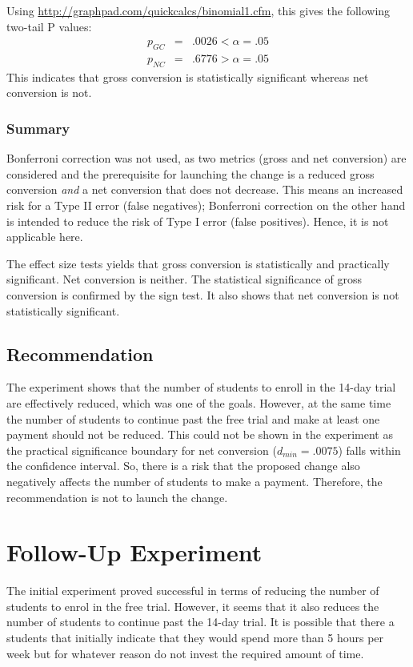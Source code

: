 \documentclass[11pt]{article} %
\begin{document}
Using \url{http://graphpad.com/quickcalcs/binomial1.cfm}, this gives the following two-tail P values:
\begin{eqnarray}
	p_{GC} &=& .0026 < \alpha = .05\\
      p_{NC} &=& .6776 > \alpha = .05
\end{eqnarray}
This indicates that gross conversion is statistically significant whereas net conversion is not.

\subsubsection{Summary}

Bonferroni correction was not used, as two metrics (gross and net conversion) are considered and the prerequisite for launching the change is a reduced gross conversion \textit{and} a net conversion that does not decrease. This means an increased risk for a Type II error (false negatives); Bonferroni correction on the other hand is intended to reduce the risk of Type I error (false positives). Hence, it is not applicable here.

The effect size tests yields that gross conversion is statistically and practically significant. Net conversion is neither. The statistical significance of gross conversion is confirmed by the sign test. It also shows that net conversion is not statistically significant.

\subsection{Recommendation}

The experiment shows that the number of students to enroll in the 14-day trial are effectively reduced, which was one of the goals. However, at the same time the number of students to continue past the free trial and make at least one payment should not be reduced. This could not be shown in the experiment as the practical significance boundary for net conversion ($d_{min} = .0075$) falls within the confidence interval. So, there is a risk that the proposed change also negatively affects the number of students to make a payment. Therefore, the recommendation is not to launch the change.

\section{Follow-Up Experiment}

The initial experiment proved successful in terms of reducing the number of students to enrol in the free trial. However, it seems that it also reduces the number of students to continue past the 14-day trial. It is possible that there a students that initially indicate that they would spend more than 5 hours per week but for whatever reason do not invest the required amount of time. \medskip
\end{document}
